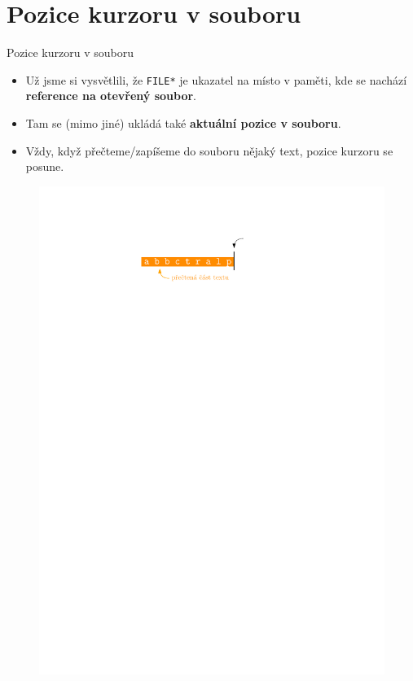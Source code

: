 \documentclass[14pt,aspectratio=169]{beamer}
\begin{document}
    \section{Pozice kurzoru v souboru}
    \begin{frame}[t]{Pozice kurzoru v souboru}
        \begin{itemize}
            \item Už jsme si vysvětlili, že \texttt{FILE*} je ukazatel na místo v paměti, kde se nachází \textbf{reference na otevřený soubor}.
            \item Tam se (mimo jiné) ukládá také \textbf{aktuální pozice v souboru}.
            \item Vždy, když přečteme/zapíšeme do souboru nějaký text, pozice kurzoru se posune.
        \end{itemize}
        \begin{figure}
            \centering
            \includegraphics[scale=1]{images/cursor.pdf}
        \end{figure}
    \end{frame}
\end{document}
